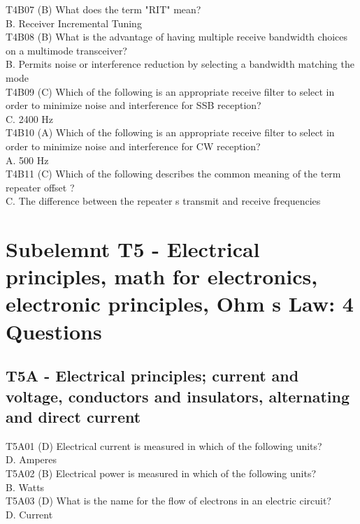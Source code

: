 \documentclass[12pt,letterpaper]{report}
\begin{document}
T4B07 (B) What does the term "RIT" mean?\\
B. Receiver Incremental Tuning\\

T4B08 (B) What is the advantage of having multiple receive bandwidth choices on a multimode transceiver?\\
B. Permits noise or interference reduction by selecting a bandwidth matching the mode\\

T4B09 (C) Which of the following is an appropriate receive filter to select in order to minimize noise and interference for SSB reception?\\
C. 2400 Hz\\

T4B10 (A) Which of the following is an appropriate receive filter to select in order to minimize noise and interference for CW reception?\\
A. 500 Hz\\

T4B11 (C) Which of the following describes the common meaning of the term  repeater offset ?\\
C. The difference between the repeater s transmit and receive frequencies\\

\chapter{Subelemnt T5 - Electrical principles, math for electronics, electronic principles, Ohm s Law: 4 Questions}

\section{T5A - Electrical principles; current and voltage, conductors and insulators, alternating and direct current}

T5A01 (D) Electrical current is measured in which of the following units?\\
D. Amperes\\

T5A02 (B) Electrical power is measured in which of the following units?\\
B. Watts\\

T5A03 (D) What is the name for the flow of electrons in an electric circuit?\\
D. Current \\
\end{document}
